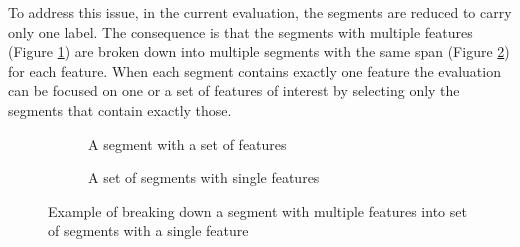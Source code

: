 To address this issue, in the current evaluation, the segments are reduced to carry only one label. The consequence is that the segments with multiple features (Figure \ref{fig:segment-multiple}) are broken down into multiple segments with the same span (Figure \ref{fig:segment-simple}) for each feature. When each segment contains exactly one feature the evaluation can be focused on one or a set of features of interest by selecting only the segments that contain exactly those. 

\begin{figure}[!ht]
    \centering
    \begin{subfigure}[b]{0.47\textwidth}
        \centering
        \caption{A segment with a set of features}
        \label{fig:segment-multiple}
    \end{subfigure}
    \begin{subfigure}[b]{0.47\textwidth}
        \centering
        \caption{A set of segments with single features}
        \label{fig:segment-simple}
    \end{subfigure}
    \caption{Example of breaking down a segment with multiple features into set of segments with a single feature}
    \label{fig:segment-breackdown}
\end{figure}

